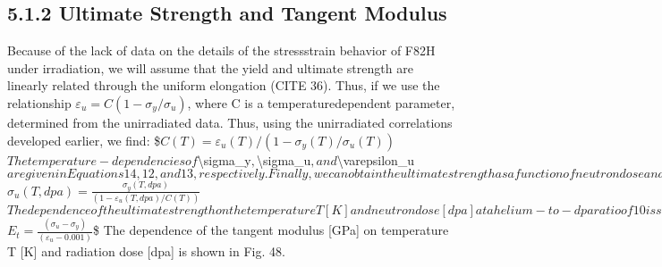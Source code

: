\documentclass[letterpaper,10pt,english]{jupyterBook}
\begin{document}
	\subsection{5.1.2 Ultimate Strength and Tangent Modulus}
	\label{\detokenize{5 Radiation Effects on Mechanical Properties:ultimate-strength-and-tangent-modulus}}
	\sphinxAtStartPar
	Because of the lack of data on the details of the stress\sphinxhyphen{}strain behavior of F82H under irradiation, we will assume that the yield and ultimate strength are linearly related through the uniform elongation (CITE 36). Thus, if we use the relationship \(\varepsilon_u = C(1 - \sigma_y / \sigma_u)\), where C is a temperature\sphinxhyphen{}dependent parameter, determined from the un\sphinxhyphen{}irradiated data. Thus, using the unirradiated correlations developed earlier, we find:
	\$\( C(T) = \varepsilon_u(T)/\left(1-\sigma_y(T)/\sigma_u(T)\right) \)\(
	The temperature-dependencies of  \)\textbackslash{}sigma\_y\(,  \)\textbackslash{}sigma\_u\(, and \)\textbackslash{}varepsilon\_u\( are given in Equations 14, 12, and 13, respectively. Finally, we can obtain the ultimate strength as a function of neutron dose and temperature in the form:
	\)\( \sigma_u(T,dpa) = \frac{\sigma_y(T,dpa)}{(1-\varepsilon_u(T,dpa)/C(T))} \)\(
	The dependence of the ultimate strength on the temperature T [K] and neutron dose [dpa] at a helium-to-dpa ratio of 10 is shown in Fig. 47. The tangent modulus, which is now a function of temperature and dose, is given by:
	\)\( E_t = \frac{(\sigma_u-\sigma_y)}{(\varepsilon_u-0.001)} \)\$
	The dependence of the tangent modulus {[}GPa{]} on temperature T {[}K{]} and radiation dose {[}dpa{]} is shown in Fig. 48.
	
\end{document}
